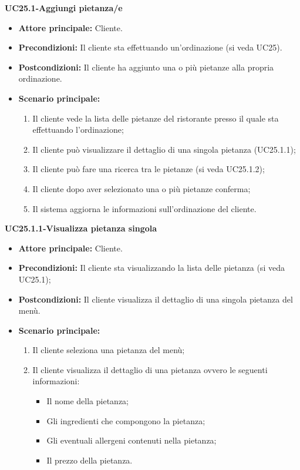 \textbf{UC25.1-Aggiungi pietanza/e}
\begin{itemize}
\item \textbf{Attore principale:} Cliente.
\item \textbf{Precondizioni:} Il cliente sta effettuando un'ordinazione (si veda UC25).
\item \textbf{Postcondizioni:} Il cliente ha aggiunto una o più pietanze alla propria ordinazione.
\item \textbf{Scenario principale:}
\begin{enumerate}
    \item Il cliente vede la lista delle pietanze del ristorante presso il quale sta effettuando l'ordinazione;
    \item Il cliente può visualizzare il dettaglio di una singola pietanza (UC25.1.1);
    \item Il cliente può fare una ricerca tra le pietanze (si veda UC25.1.2);
    \item Il cliente dopo aver selezionato una o più pietanze conferma;
    \item Il sistema aggiorna le informazioni sull'ordinazione del cliente.
\end{enumerate}
\end{itemize}

\textbf{UC25.1.1-Visualizza pietanza singola}
\begin{itemize}
\item \textbf{Attore principale:} Cliente.
\item \textbf{Precondizioni:} Il cliente sta visualizzando la lista delle pietanza (si veda UC25.1);
\item \textbf{Postcondizioni:} Il cliente visualizza il dettaglio di una singola pietanza del menù.
\item \textbf{Scenario principale:}
\begin{enumerate}
    \item Il cliente seleziona una pietanza del menù;
    \item Il cliente visualizza il dettaglio di una pietanza ovvero le seguenti informazioni:
    \begin{itemize}
        \item Il nome della pietanza;
        \item Gli ingredienti che compongono la pietanza;
        \item Gli eventuali allergeni contenuti nella pietanza;
        \item Il prezzo della pietanza.
    \end{itemize}
\end{enumerate}
\end{itemize}

